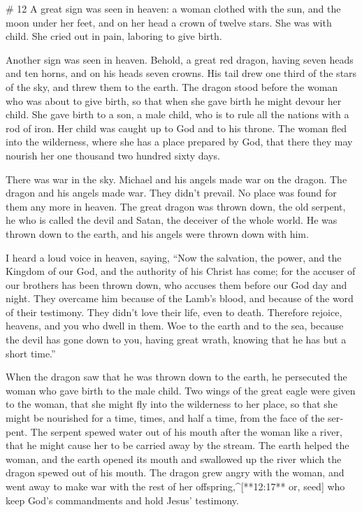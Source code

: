 \begin{paracols}{2}
\switchcolumn
\begin{english}

# 12
 A great sign was seen in heaven: a woman clothed with the sun, and the moon under her feet, and on her head a crown of twelve stars.  She was with child. She cried out in pain, laboring to give birth. 

 Another sign was seen in heaven. Behold, a great red dragon, having seven heads and ten horns, and on his heads seven crowns.  His tail drew one third of the stars of the sky, and threw them to the earth. The dragon stood before the woman who was about to give birth, so that when she gave birth he might devour her child.  She gave birth to a son, a male child, who is to rule all the nations with a rod of iron. Her child was caught up to God and to his throne.  The woman fled into the wilderness, where she has a place prepared by God, that there they may nourish her one thousand two hundred sixty days. 

 There was war in the sky. Michael and his angels made war on the dragon. The dragon and his angels made war.  They didn’t prevail. No place was found for them any more in heaven.  The great dragon was thrown down, the old serpent, he who is called the devil and Satan, the deceiver of the whole world. He was thrown down to the earth, and his angels were thrown down with him. 

 I heard a loud voice in heaven, saying, “Now the salvation, the power, and the Kingdom of our God, and the authority of his Christ has come; for the accuser of our brothers has been thrown down, who accuses them before our God day and night.  They overcame him because of the Lamb’s blood, and because of the word of their testimony. They didn’t love their life, even to death.  Therefore rejoice, heavens, and you who dwell in them. Woe to the earth and to the sea, because the devil has gone down to you, having great wrath, knowing that he has but a short time.” 

 When the dragon saw that he was thrown down to the earth, he persecuted the woman who gave birth to the male child.  Two wings of the great eagle were given to the woman, that she might fly into the wilderness to her place, so that she might be nourished for a time, times, and half a time, from the face of the serpent.  The serpent spewed water out of his mouth after the woman like a river, that he might cause her to be carried away by the stream.  The earth helped the woman, and the earth opened its mouth and swallowed up the river which the dragon spewed out of his mouth.  The dragon grew angry with the woman, and went away to make war with the rest of her offspring,^[**12:17** or, seed] who keep God’s commandments and hold Jesus’ testimony.


\end{english}
\end{paracols}
